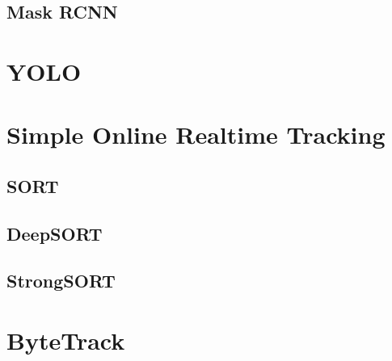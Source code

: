 \documentclass{article}
\begin{document}
  \subsection{Mask RCNN}

\section{YOLO}

\section{Simple Online Realtime Tracking} 

  \subsection{SORT}

  \subsection{DeepSORT}

  \subsection{StrongSORT}

\section{ByteTrack}
\end{document}
